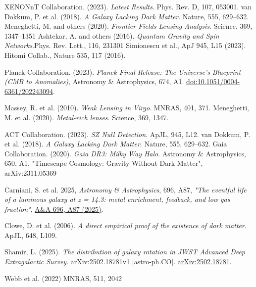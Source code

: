 \documentclass{article}
\begin{document}
\begin{thebibliography}{9}

 XENONnT Collaboration. (2023). \emph{Latest Results}. Phys. Rev. D, 107, 053001.
 van Dokkum, P. et al. (2018). \emph{A Galaxy Lacking Dark Matter}. Nature, 555, 629--632.
 Meneghetti, M. and others (2020). \emph{Frontier Fields Lensing Analysis}. Science, 369, 1347--1351
 Ashtekar, A. and others (2016). \emph{Quantum Gravity and Spin Networks}.Phys. Rev. Lett., 116, 231301
 Simionescu et al., ApJ 945, L15 (2023).
 Hitomi Collab., Nature 535, 117 (2016).

Planck Collaboration. (2023). 
\textit{Planck Final Release: The Universe's Blueprint (CMB to Anomalies)}, 
Astronomy \& Astrophysics, 674, A1. 
\href{https://doi.org/10.1051/0004-6361/202243094}{doi:10.1051/0004-6361/202243094}.

 Massey, R. et al. (2010). \emph{Weak Lensing in Virgo}. MNRAS, 401, 371.  
 Meneghetti, M. et al. (2020). \emph{Metal-rich lenses}. Science, 369, 1347.  

 ACT Collaboration. (2023). \emph{SZ Null Detection}. ApJL, 945, L12.  
 van Dokkum, P. et al. (2018). \emph{A Galaxy Lacking Dark Matter}. Nature, 555, 629--632.
 Gaia Collaboration. (2020). \emph{Gaia DR3: Milky Way Halo}. Astronomy \& Astrophysics, 650, A1.
 "Timescape Cosmology: Gravity Without Dark Matter", arXiv:2311.05369

Carniani, S. et al. 2025, \textit{Astronomy \& Astrophysics}, 696, A87, 
\textit{"The eventful life of a luminous galaxy at z = 14.3: metal enrichment, feedback, and low gas fraction"}, 
\href{https://doi.org/10.1051/0004-6361/202449321}{A\&A 696, A87 (2025)}.


 Clowe, D. et al. (2006). \emph{A direct empirical proof of the existence of dark matter}. ApJL, 648, L109.

Shamir, L. (2025).  
\textit{The distribution of galaxy rotation in JWST Advanced Deep Extragalactic Survey}.  
arXiv:2502.18781v1 [astro-ph.CO].  
\href{https://arxiv.org/abs/2502.18781}{arXiv:2502.18781}. 


 Webb et al. (2022) MNRAS, 511, 2042  


\end{thebibliography}
\end{document}
